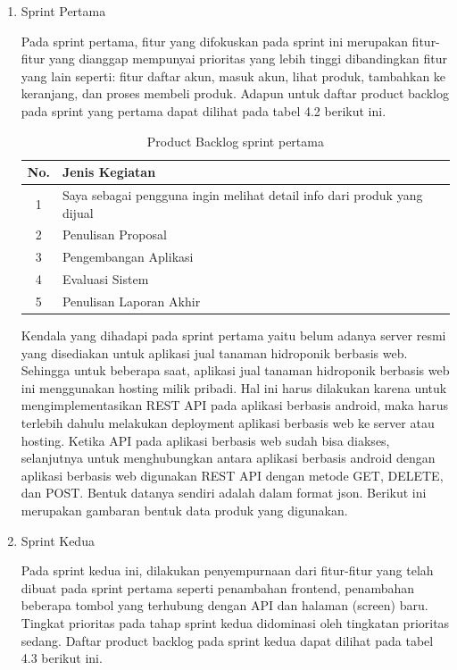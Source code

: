 \begin{enumerate}
	\item Sprint Pertama
	\par Pada sprint pertama, fitur yang difokuskan pada sprint ini merupakan fitur-fitur
	yang dianggap mempunyai prioritas yang lebih tinggi dibandingkan fitur yang lain
	seperti: fitur daftar akun, masuk akun, lihat produk, tambahkan ke keranjang, dan
	proses membeli produk. Adapun untuk daftar product backlog pada sprint yang
	pertama dapat dilihat pada tabel 4.2 berikut ini.

	\begin{table}[H]
		\begin{center}
		\caption{Product Backlog sprint pertama}
		\label{tab:jadwal}
		\begin{tabular}{|c|l|}
		\hline
		No.&Jenis Kegiatan\\
		\hline
		1&Saya sebagai pengguna ingin melihat detail info dari produk yang dijual\\
		\hline
		2&Penulisan Proposal\\
		\hline
		3&Pengembangan Aplikasi\\
		\hline
		4&Evaluasi Sistem\\
		\hline
		5&Penulisan Laporan Akhir\\
		\hline
		\end{tabular}
		\end{center}
	\end{table}

	\par Kendala yang dihadapi pada sprint pertama yaitu belum adanya server resmi yang
	disediakan untuk aplikasi jual tanaman hidroponik berbasis web. Sehingga untuk
	beberapa saat, aplikasi jual tanaman hidroponik berbasis web ini menggunakan
	hosting milik pribadi. Hal ini harus dilakukan karena untuk mengimplementasikan
	REST API pada aplikasi berbasis android, maka harus terlebih dahulu melakukan
	deployment aplikasi berbasis web ke server atau hosting.
	Ketika API pada aplikasi berbasis web sudah bisa diakses, selanjutnya untuk
	menghubungkan antara aplikasi berbasis android dengan aplikasi berbasis web
	digunakan REST API dengan metode GET, DELETE, dan POST. Bentuk datanya
	sendiri adalah dalam format json. Berikut ini merupakan gambaran bentuk data
	produk yang digunakan.

	\item Sprint Kedua
	\par Pada sprint kedua ini, dilakukan penyempurnaan dari fitur-fitur yang telah dibuat
	pada sprint pertama seperti penambahan frontend, penambahan beberapa tombol
	yang terhubung dengan API dan halaman (screen) baru. Tingkat prioritas pada
	tahap sprint kedua didominasi oleh tingkatan prioritas sedang. Daftar product
	backlog pada sprint kedua dapat dilihat pada tabel 4.3 berikut ini.


\end{enumerate}

